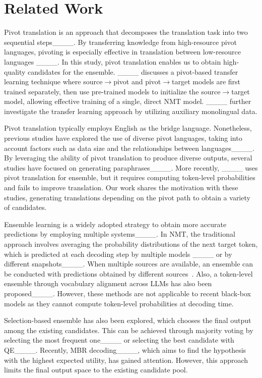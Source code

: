 \section{Related Work}
Pivot translation is an approach that decomposes the translation task into two sequential steps____.
By transferring knowledge from high-resource pivot languages, pivoting is especially effective in translation between low-resource languages ____.
In this study, pivot translation enables us to obtain high-quality candidates for the ensemble.
____ discusses a pivot-based transfer learning technique where source$\rightarrow$pivot and pivot$\rightarrow$target models are first trained separately, then use pre-trained models to initialize the source$\rightarrow$target model, allowing effective training of a single, direct NMT model.
____ further investigate the transfer learning approach by utilizing auxiliary monolingual data.


Pivot translation typically employs English as the bridge language.
Nonetheless, previous studies have explored the use of diverse pivot languages, taking into account factors such as data size and the relationships between languages____.
By leveraging the ability of pivot translation to produce diverse outputs, several studies have focused on generating paraphrases____.
More recently, ____ uses pivot translation for ensemble, but it requires computing token-level probabilities and fails to improve translation.
Our work shares the motivation with these studies, generating translations depending on the pivot path to obtain a variety of candidates.


Ensemble learning is a widely adopted strategy to obtain more accurate predictions by employing multiple systems____.
In NMT, the traditional approach involves averaging the probability distributions of the next target token, which is predicted at each decoding step by multiple models ____ or by different snapshots____.
When multiple sources are available, an ensemble can be conducted with predictions obtained by different sources~\cite {firat-etal-2016-zero}.
Also, a token-level ensemble through vocabulary alignment across LLMs has also been proposed____.
However, these methods are not applicable to recent black-box models as they cannot compute token-level probabilities at decoding time.


Selection-based ensemble has also been explored, which chooses the final output among the existing candidates.
This can be achieved through majority voting by selecting the most frequent one____ or selecting the best candidate with QE____.
Recently, MBR decoding____, which aims to find the hypothesis with the highest expected utility, has gained attention.
However, this approach limits the final output space to the existing candidate pool.


